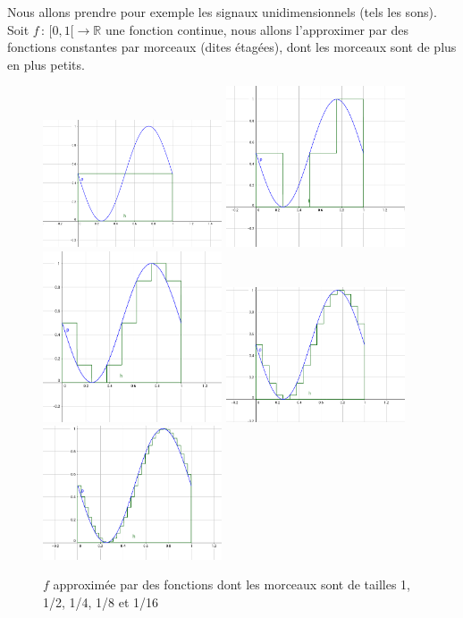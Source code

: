 \documentclass[]{article}
\theoremstyle{remark}
\theoremstyle{definition}
\newcommand{\funcshort}[3]{
	#1 \, : \, #2 \longrightarrow #3
}
\begin{document}
	Nous allons prendre pour exemple les signaux unidimensionnels (tels les sons). Soit $\funcshort{f}{[0, 1[}{\mathbb{R}}$ une fonction continue, nous allons l'approximer par des fonctions constantes par morceaux (dites étagées), dont les morceaux sont de plus en plus petits.
	
	\begin{figure}[h]
		\centering
		\includegraphics[width=150pt]{sin_1.png}
		\includegraphics[width=150pt]{sin_2.png}
		\includegraphics[width=150pt]{sin_4.png}
		\includegraphics[width=150pt]{sin_8.png}
		\includegraphics[width=150pt]{sin_16.png}
		\caption{$f$ approximée par des fonctions dont les morceaux sont de tailles 1, 1/2, 1/4, 1/8 et 1/16}
	\end{figure}
	
\end{document}
